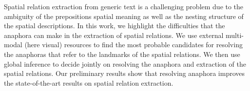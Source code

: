 Spatial relation extraction from generic text is a challenging problem due to the ambiguity of the prepositions spatial meaning as well as the nesting structure of the spatial descriptions. In this work, we highlight the difficulties that the anaphora can make in the extraction of spatial relations. We use external multi-modal (here visual) resources to find the most probable candidates for resolving the anaphoras that refer to the landmarks of the spatial relations. We then use global inference to decide jointly on resolving the anaphora and extraction of the spatial relations. Our preliminary results show that resolving anaphora  improves the state-of-the-art results on spatial relation extraction.
